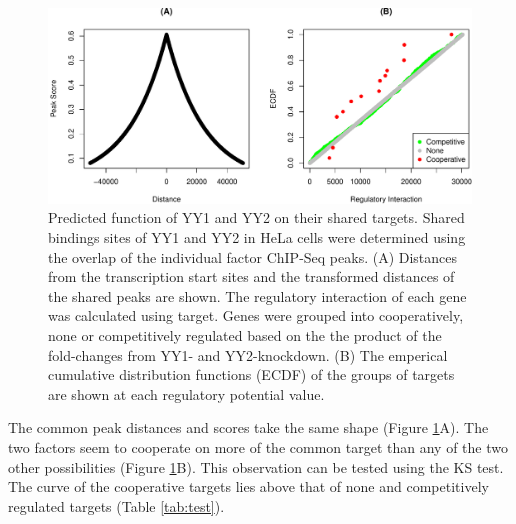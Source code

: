 \documentclass[9pt,a4paper,]{extarticle}
\newenvironment{Shaded}{\begin{snugshade}}{\end{snugshade}}
\newcommand{\CommentTok}[1]{\textcolor[rgb]{0.56,0.35,0.01}{\textit{#1}}}
\newcommand{\DataTypeTok}[1]{\textcolor[rgb]{0.13,0.29,0.53}{#1}}
\newcommand{\KeywordTok}[1]{\textcolor[rgb]{0.13,0.29,0.53}{\textbf{#1}}}
\newcommand{\NormalTok}[1]{#1}
\newcommand{\OperatorTok}[1]{\textcolor[rgb]{0.81,0.36,0.00}{\textbf{#1}}}
\newcommand{\StringTok}[1]{\textcolor[rgb]{0.31,0.60,0.02}{#1}}
\begin{document}
\begin{figure}

{\centering \includegraphics[width=1\linewidth]{targetFlow_files/figure-latex/function-1} 

}

\caption{Predicted function of YY1 and YY2 on their shared targets. Shared bindings sites of YY1 and YY2 in HeLa cells were determined using the overlap of the individual factor ChIP-Seq peaks. (A) Distances from the transcription start sites and the transformed distances of the shared peaks are shown. The regulatory interaction of each gene was calculated using target. Genes were grouped into cooperatively, none or competitively regulated based on the the product of the fold-changes from YY1- and YY2-knockdown. (B) The emperical cumulative distribution functions (ECDF) of the groups of targets are shown at each regulatory potential value.}\label{fig:function}
\end{figure}

The common peak distances and scores take the same shape (Figure \ref{fig:function}A). The two factors seem to cooperate on more of the common target than any of the two other possibilities (Figure \ref{fig:function}B). This observation can be tested using the KS test. The curve of the cooperative targets lies above that of none and competitively regulated targets (Table \ref{tab:test}).

\begin{Shaded}
\end{Shaded}
\end{document}
